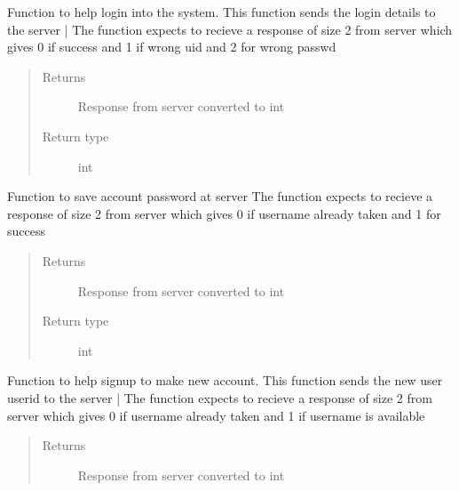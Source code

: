 \documentclass[letterpaper,10pt,english]{sphinxmanual}
\begin{document}
\begin{fulllineitems}

\begin{fulllineitems}
\label{\detokenize{Message:Message.Message._login}}
Function to help login into the system. This function sends the login details to the server |
The function expects to recieve a response of size 2 from server which gives 0 if success and 1 if wrong uid and 2 for wrong passwd
\begin{quote}\begin{description}
\item[{Returns}] \leavevmode
Response from server converted to int

\item[{Return type}] \leavevmode
int

\end{description}\end{quote}

\end{fulllineitems}


\begin{fulllineitems}
\label{\detokenize{Message:Message.Message._signuppass}}
Function to save account password at server
The function expects to recieve a response of size 2 from server which gives 0 if username already taken and 1 for success
\begin{quote}\begin{description}
\item[{Returns}] \leavevmode
Response from server converted to int

\item[{Return type}] \leavevmode
int

\end{description}\end{quote}

\end{fulllineitems}


\begin{fulllineitems}
\label{\detokenize{Message:Message.Message._signupuid}}
Function to help signup to make new account. This function sends the new user userid to the server |
The function expects to recieve a response of size 2 from server which gives 0 if username already taken and 1 if username is available
\begin{quote}\begin{description}
\item[{Returns}] \leavevmode
Response from server converted to int


\end{description}
\end{quote}
\end{fulllineitems}
\end{fulllineitems}
\end{document}
